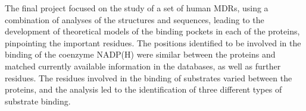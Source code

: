 \documentclass[a4paper, 12pt]{report}
\begin{document}
The final project focused on the study of a set of human MDRs, using a combination of analyses of the structures and sequences, leading to the development of theoretical models of the binding pockets in each of the proteins, pinpointing the important residues. The positions identified to be involved in the binding of the coenzyme NADP(H) were similar between the proteins and matched currently available information in the databases, as well as further residues. The residues involved in the binding of substrates varied between the proteins, and the analysis led to the identification of three different types of substrate binding.

\thispagestyle{empty}
\end{document}
